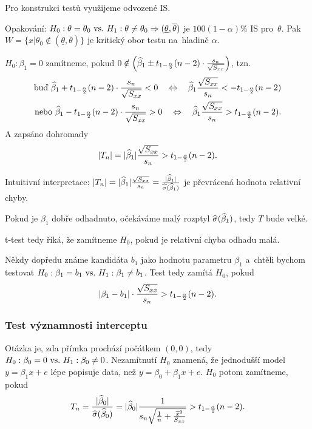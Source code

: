 Pro konstrukci testů využijeme odvozené IS.

\begin{remark}
	Opakování: $H_0: \theta = \theta_0 ~\text{vs.}~ H_1: \theta \neq \theta_0 \Rightarrow (\underline{\theta}, \overline{\theta})$ je $100(1-\alpha)\%$ IS pro~$\theta$. Pak $W = \{ x | \theta_0 \notin (\underline{\theta}, \overline{\theta}) \}$ je kritický obor testu na~hladině $\alpha$.
\end{remark}

 $H_0: \beta_1 = 0$ zamítneme, pokud $0 \notin \left(\widehat{\beta}_1 \pm t_{1-\frac{\alpha}{2}}(n-2) \cdot  \frac{s_n}{\sqrt{S_{xx}}} \right)$, tzn.
\begin{align*}
	\text{buď } \widehat{\beta}_1 + t_{1-\frac{\alpha}{2}}(n-2) \cdot  \frac{s_n}{\sqrt{S_{xx}}} < 0 \quad\Leftrightarrow\quad \widehat{\beta}_1 \frac{\sqrt{S_{xx}}}{s_n} < - t_{1-\frac{\alpha}{2}}(n-2) \\
	\text{nebo } \widehat{\beta}_1 - t_{1-\frac{\alpha}{2}}(n-2) \cdot  \frac{s_n}{\sqrt{S_{xx}}} > 0 \quad\Leftrightarrow\quad \widehat{\beta}_1 \frac{\sqrt{S_{xx}}}{s_n} > t_{1-\frac{\alpha}{2}}(n-2).
\end{align*}
A zapsáno dohromady
 $$
	|T_n| = |\widehat{\beta}_1| \frac{\sqrt{S_{xx}}}{s_n} > t_{1-\frac{\alpha}{2}}(n-2).
 $$

\begin{remark}
	Intuitivní interpretace: $|T_n| = |\widehat{\beta}_1| \frac{\sqrt{S_{xx}}}{s_n} = \frac{|\widehat{\beta}_1|}{\widehat{\sigma}(\widehat{\beta}_1)}$ je převrácená hodnota relativní chyby.
	
	Pokud je $\beta_1$ dobře odhadnuto, očekáváme malý rozptyl $\widehat{\sigma}(\widehat{\beta}_1)$, tedy $T$ bude velké.
	
	t-test tedy říká, že zamítneme $H_0$, pokud je relativní chyba odhadu malá.
\end{remark}%
\begin{remark}
	Někdy dopředu známe kandidáta $b_1$ jako hodnotu parametru $\beta_1$ a~chtěli bychom testovat
	 $H_0: \beta_1 = b_1 ~\text{vs.}~ H_1: \beta_1\neq b_1$. Test tedy zamítá $H_0$, pokud
	 $$ \left|\beta_1-b_1\right|\cdot \frac{\sqrt{S_{xx}}}{s_n}> t_{1-\frac{\alpha}{2}}(n-2). $$
\end{remark}
\subsubsection*{Test významnosti interceptu}
Otázka je, zda přímka prochází počátkem $(0,0)$, tedy $H_0: \beta_0 = 0 ~\text{vs.}~ H_1: \beta_0\neq0$. Nezamítnutí $H_0$ znamená, že jednodušší model $y = \beta_1 x+e$ lépe popisuje data, než $y = \beta_0+\beta_1 x+e$. $H_0$ potom zamítneme, pokud
 $$ T_n = \frac{|\widehat{\beta}_0|}{\widehat{\sigma}(\widehat{\beta}_0)} = |\widehat{\beta}_0|\frac{1}{s_n\sqrt{\frac{1}{n}+\frac{\overline{x}^2}{S_{xx}}}}>t_{1-\frac{\alpha}{2}}(n-2). $$

